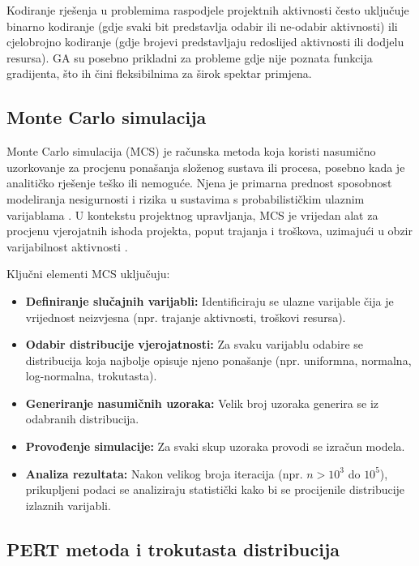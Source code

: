 Kodiranje rješenja u problemima raspodjele projektnih aktivnosti često uključuje binarno kodiranje (gdje svaki bit predstavlja odabir ili ne-odabir aktivnosti) ili cjelobrojno kodiranje (gdje brojevi predstavljaju redoslijed aktivnosti ili dodjelu resursa). GA su posebno prikladni za probleme gdje nije poznata funkcija gradijenta, što ih čini fleksibilnima za širok spektar primjena.

\subsection{Monte Carlo simulacija}

Monte Carlo simulacija (MCS) je računska metoda koja koristi nasumično uzorkovanje za procjenu ponašanja složenog sustava ili procesa, posebno kada je analitičko rješenje teško ili nemoguće. Njena je primarna prednost sposobnost modeliranja nesigurnosti i rizika u sustavima s probabilističkim ulaznim varijablama \cite{Vose2008}. U kontekstu projektnog upravljanja, MCS je vrijedan alat za procjenu vjerojatnih ishoda projekta, poput trajanja i troškova, uzimajući u obzir varijabilnost aktivnosti \cite{Miller2009, Avlijas2008}.

Ključni elementi MCS uključuju:

\begin{itemize}
    \item \textbf{Definiranje slučajnih varijabli:} Identificiraju se ulazne varijable čija je vrijednost neizvjesna (npr. trajanje aktivnosti, troškovi resursa).
    \item \textbf{Odabir distribucije vjerojatnosti:} Za svaku varijablu odabire se distribucija koja najbolje opisuje njeno ponašanje (npr. uniformna, normalna, log-normalna, trokutasta).
    \item \textbf{Generiranje nasumičnih uzoraka:} Velik broj uzoraka generira se iz odabranih distribucija.
    \item \textbf{Provođenje simulacije:} Za svaki skup uzoraka provodi se izračun modela.
    \item \textbf{Analiza rezultata:} Nakon velikog broja iteracija (npr. $n > 10^3$ do $10^5$), prikupljeni podaci se analiziraju statistički kako bi se procijenile distribucije izlaznih varijabli.
\end{itemize}

\subsection{PERT metoda i trokutasta distribucija}

